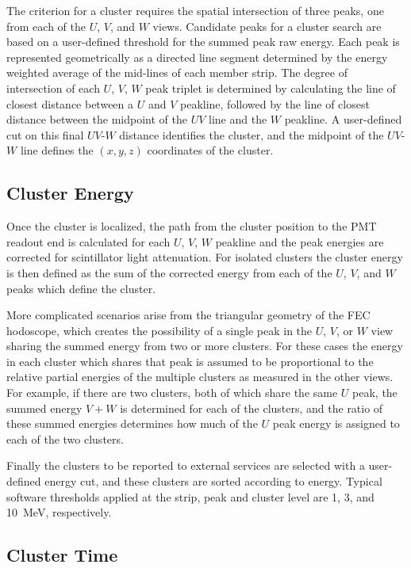 \documentclass{elsart}
\begin{document}
The criterion for a cluster requires the spatial intersection of three peaks, one from each of the $U$, $V$, and $W$ views.
Candidate peaks for a cluster search are based on a user-defined threshold for the summed peak raw energy.  Each peak is
represented geometrically as a directed line segment determined by the energy weighted average of the mid-lines of each
member strip.   The degree of intersection of each $U$, $V$, $W$ peak triplet is determined by calculating the line of
closest distance between a $U$ and $V$ peakline, followed by the line of closest distance between the midpoint of the $UV$
line and the $W$ peakline.  A user-defined cut on this final $UV$-$W$ distance identifies the cluster, and the midpoint of
the $UV$-$W$ line defines the $(x,y,z)$ coordinates of the cluster.  

\subsection {Cluster Energy}

Once the cluster is localized, the path from the cluster position to the PMT readout end is calculated for each $U$, $V$,
$W$ peakline and the peak energies are corrected for scintillator light attenuation.  For isolated clusters the cluster energy
is then defined as the sum of the corrected energy from each of the $U$, $V$, and $W$ peaks which define the cluster.  

More complicated scenarios arise from the triangular geometry of the FEC hodoscope, which creates the possibility of a
single peak in the $U$, $V$, or $W$ view sharing the summed energy from two or more clusters.  For these cases the energy
in each cluster which shares that peak is assumed to be proportional to the relative partial energies of the multiple clusters as
measured in the other views.  For example, if there are two clusters, both of which share the same $U$ peak, the summed
energy $V+W$ is determined for each of the clusters, and the ratio of these summed energies determines how much of the
$U$ peak energy is assigned to each of the two clusters.  

Finally the clusters to be reported to external services are selected with a user-defined energy cut, and these clusters
are sorted according to energy. Typical software thresholds applied at the strip, peak and cluster level are 1, 3, and 10~MeV,
respectively. 

\subsection {Cluster Time}
\end{document}
